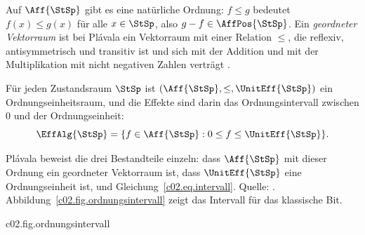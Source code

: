 \begin{fundament}[id=c02.f1,
    titel={Ordnungseinheitsräume},
    wozu={Die Effekte eines Zustandsraums bilden ein Intervall in einem geordneten
      Vektorraum mit Ordnungseinheit. Hier steht diese Struktur so, wie Plávala sie für
      endliche Dimension angibt, und es wird gesagt, was der Kurs darüber hinaus noch
      schuldet.},
    voraussetzung={Vertiefung~\ref{c02.v2}; Halbordnungen. Weder Kern noch Vertiefungen
      brauchen diesen Block.},
    zurueck={Man kann eine Theorie mit ihren Zuständen beginnen oder mit ihren Effekten;
      in endlicher Dimension führt beides zu demselben Rahmen.}]
  Auf $\Aff{\StSp}$ gibt es eine natürliche Ordnung: $f \leq g$ bedeutet
  $f(x) \leq g(x)$ für alle $x \in \StSp$, also $g - f \in \AffPos{\StSp}$. Ein
  \emph{geordneter Vektorraum} ist bei Plávala ein Vektorraum mit einer Relation $\leq$,
  die reflexiv, antisymmetrisch und transitiv ist und sich mit der Addition und mit der
  Multiplikation mit nicht negativen Zahlen verträgt
  .


  \begin{proposition}\label{c02.prop.oeraum}
    Für jeden Zustandsraum $\StSp$ ist $(\Aff{\StSp}, \leq, \UnitEff{\StSp})$ ein
    Ordnungseinheitsraum, und die Effekte sind darin das Ordnungsintervall zwischen $0$
    und der Ordnungseinheit:
    \begin{equation}\label{c02.eq.intervall}
      \EffAlg{\StSp} = \{ f \in \Aff{\StSp} : 0 \leq f \leq \UnitEff{\StSp} \} .
    \end{equation}
  \end{proposition}

  Plávala beweist die drei Bestandteile einzeln: dass $\Aff{\StSp}$ mit dieser Ordnung ein
  geordneter Vektorraum ist, dass $\UnitEff{\StSp}$ eine Ordnungseinheit ist, und
  Gleichung~\eqref{c02.eq.intervall}. Quelle:
  .
  Abbildung~\ref{c02.fig.ordnungsintervall} zeigt das Intervall für das klassische Bit.

  \begin{tpcfigure}{c02.fig.ordnungsintervall}
    \caption{Die Effektmenge des klassischen Bits als Ordnungsintervall, in den Koordinaten
      $(q_0, q_1)$ aus Proposition~\ref{c02.prop.bit}. Der positive Kegel $\AffPos{\StSp}$
      ist der Quadrant rechts oben vom Nullpunkt. Die Bedingung $f \leq \UnitEff{\StSp}$
      sagt, dass $\UnitEff{\StSp} - f$ in diesem Kegel liegt; das ist der Quadrant links
      unten von $\UnitEff{\StSp}$. Der Durchschnitt der beiden Quadranten ist das
      Einheitsquadrat $\EffAlg{\StSp}$.}
  \end{tpcfigure}


\end{fundament}
